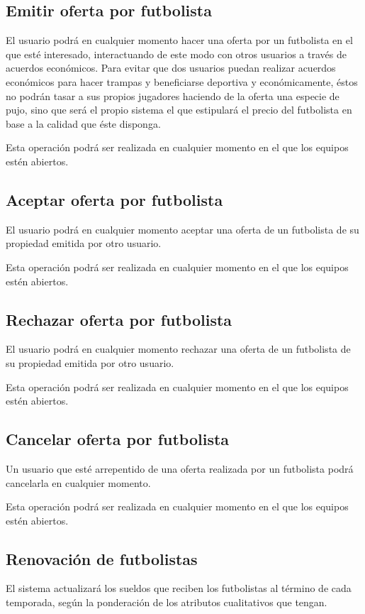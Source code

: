 \subsection{Emitir oferta por futbolista}
El usuario podrá en cualquier momento hacer una oferta por un
futbolista en el que esté interesado, interactuando de este modo con
otros usuarios a través de acuerdos económicos. Para evitar que dos
usuarios puedan realizar acuerdos económicos para hacer trampas y
beneficiarse deportiva y económicamente, éstos no podrán tasar a sus
propios jugadores haciendo de la oferta una especie de pujo, sino que
será el propio sistema el que estipulará el precio del futbolista en
base a la calidad que éste disponga.

Esta operación podrá ser realizada en cualquier momento en el que
los equipos estén abiertos.

\subsection{Aceptar oferta por futbolista}
El usuario podrá en cualquier momento aceptar una oferta de un
futbolista de su propiedad emitida por otro usuario.

Esta operación podrá ser realizada en cualquier momento en el que los
equipos estén abiertos.

\subsection{Rechazar oferta por futbolista}
El usuario podrá en cualquier momento rechazar una oferta de un
futbolista de su propiedad emitida por otro usuario.

Esta operación podrá ser realizada en cualquier momento en el que los
equipos estén abiertos.

\subsection{Cancelar oferta por futbolista}
Un usuario que esté arrepentido de una oferta realizada por un
futbolista podrá cancelarla en cualquier momento.

Esta operación podrá ser realizada en cualquier momento en el que los
equipos estén abiertos.

\subsection{Renovación de futbolistas}
El sistema actualizará los sueldos que reciben los futbolistas al
término de cada temporada, según la ponderación de los atributos
cualitativos que tengan.\\

